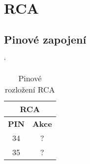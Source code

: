 
\section{RCA}
\subsection{Pinové zapojení}
\begin{table} [h!]
	\centering
	\catcode`
	\begin{tabular}[c]{|| c | c ||}
	\hline
		\multicolumn{2}{||c||}{RCA} \\
	\hline
 		 \textbf{PIN} & \textbf{Akce}\\
	\hline
		34 &  ?\\
	\hline
		35 & ? \\
	\hline
	\end{tabular}
	\caption{Pinové rozložení RCA}
	\label{table:pinRCA}
\end{table}
